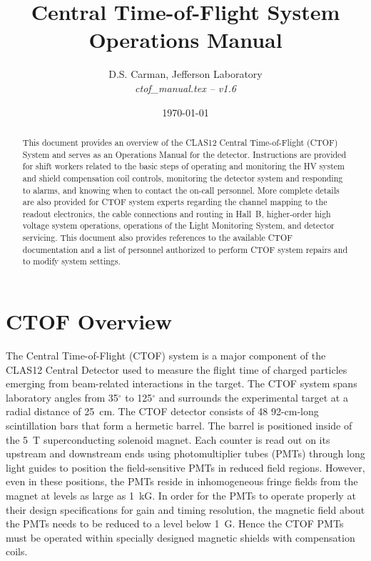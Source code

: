 \documentclass[12pt]{article}
\begin{document}
\title{Central Time-of-Flight System Operations Manual}

\vskip 0.5cm

\author{D.S. Carman, Jefferson Laboratory\\[0.2ex]
{\it ctof\_manual.tex -- v1.6}}

\date \today
%
\maketitle

\begin{abstract}
This document provides an overview of the CLAS12 Central Time-of-Flight (CTOF) 
System and serves as an Operations Manual for the detector. Instructions are 
provided for shift workers related to the basic steps of operating and monitoring 
the HV system and shield compensation coil controls, monitoring the detector 
system and responding to alarms, and knowing when to contact the on-call personnel. 
More complete details are also provided for CTOF system experts regarding the 
channel mapping to the readout electronics, the cable connections and routing in 
Hall~B, higher-order high voltage system operations, operations of the Light 
Monitoring System, and detector servicing. This document also provides references 
to the available CTOF documentation and a list of personnel authorized to perform 
CTOF system repairs and to modify system settings.
\end{abstract}

\thispagestyle{empty}

\clearpage

\vfil
\eject

\tableofcontents

\vfil
\eject

\section{CTOF Overview}
\label{intro}

The Central Time-of-Flight (CTOF) system is a major component of the CLAS12 
Central Detector used to measure the flight time of charged particles emerging 
from beam-related interactions in the target. The CTOF system spans laboratory 
angles from 35$^\circ$ to 125$^\circ$ and surrounds the experimental target at a 
radial distance of 25~cm. The CTOF detector consists of 48 92-cm-long scintillation 
bars that form a hermetic barrel. The barrel is positioned inside of the 5~T 
superconducting solenoid magnet. Each counter is read out on its upstream and
downstream ends using photomultiplier tubes (PMTs) through long light guides to 
position the field-sensitive PMTs in reduced field regions. However, even in these 
positions, the PMTs reside in inhomogeneous fringe fields from the magnet at levels 
as large as 1~kG. In order for the PMTs to operate properly at their design 
specifications for gain and timing resolution, the magnetic field about the PMTs 
needs to be reduced to a level below 1~G. Hence the CTOF PMTs must be operated 
within specially designed magnetic shields with compensation coils.
\end{document}
